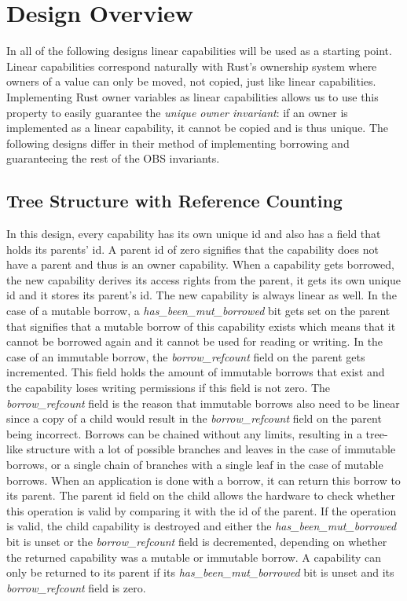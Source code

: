 \section{Design Overview}
In all of the following designs linear capabilities will be used as a starting point. Linear capabilities correspond naturally with Rust's ownership system where owners of a value can only be moved, not copied, just like linear capabilities. Implementing Rust owner variables as linear capabilities allows us to use this property to easily guarantee the \textit{unique owner invariant}: if an owner is implemented as a linear capability, it cannot be copied and is thus unique. The following designs differ in their method of implementing borrowing and guaranteeing the rest of the OBS invariants.

\subsection{Tree Structure with Reference Counting}
In this design, every capability has its own unique id and also has a field that holds its parents' id. A parent id of zero signifies that the capability does not have a parent and thus is an owner capability. When a capability gets borrowed, the new capability derives its access rights from the parent, it gets its own unique id and it stores its parent's id. The new capability is always linear as well. In the case of a mutable borrow, a \textit{has\_been\_mut\_borrowed} bit gets set on the parent that signifies that a mutable borrow of this capability exists which means that it cannot be borrowed again and it cannot be used for reading or writing. In the case of an immutable borrow, the \textit{borrow\_refcount} field on the parent gets incremented. This field holds the amount of immutable borrows that exist and the capability loses writing permissions if this field is not zero. The \textit{borrow\_refcount} field is the reason that immutable borrows also need to be linear since a copy of a child would result in the \textit{borrow\_refcount} field on the parent being incorrect.
Borrows can be chained without any limits, resulting in a tree-like structure with a lot of possible branches and leaves in the case of immutable borrows, or a single chain of branches with a single leaf in the case of mutable borrows. When an application is done with a borrow, it can return this borrow to its parent. The parent id field on the child allows the hardware to check whether this operation is valid by comparing it with the id of the parent. If the operation is valid, the child capability is destroyed and either the \textit{has\_been\_mut\_borrowed} bit is unset or the \textit{borrow\_refcount} field is decremented, depending on whether the returned capability was a mutable or immutable borrow. A capability can only be returned to its parent if its \textit{has\_been\_mut\_borrowed} bit is unset and its \textit{borrow\_refcount} field is zero.


